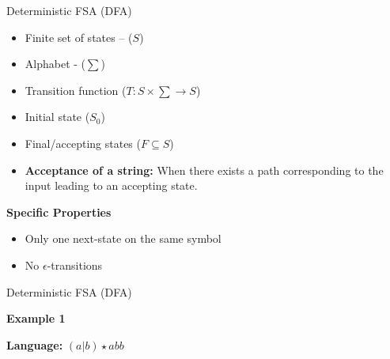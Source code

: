 \documentclass{beamer}
\newcommand{\myminorheader}[1]{
	{\color{BrickRed}
		\begin{Large}
			{\fontfamily{\sfdefault}\selectfont\textbf{#1}}
		\end{Large}
	}
}
\begin{document}
\begin{frame}{Deterministic FSA (DFA)}
\begin{itemize}
	\item Finite set of states -- ($S$)
	\item Alphabet - ($\sum$)
	\item Transition function ($T : S \times \sum \rightarrow S$)
	\item Initial state ($S_0$)
	\item Final/accepting states ($F \subseteq S$)
	\item \textbf{Acceptance of a string: }When there exists a path corresponding to the input leading to an accepting state.
\end{itemize}

\pause
\myminorheader{Specific Properties}
\begin{itemize}
	\item Only one next-state on the same symbol
	\item No $\epsilon$-transitions
\end{itemize}

\end{frame}

\begin{frame}{Deterministic FSA (DFA)}

\myminorheader{Example 1}

\begin{center}

\end{center}
\pause
\textbf{Language:} \pause$(a|b)\star abb$


\end{frame}
\end{document}
